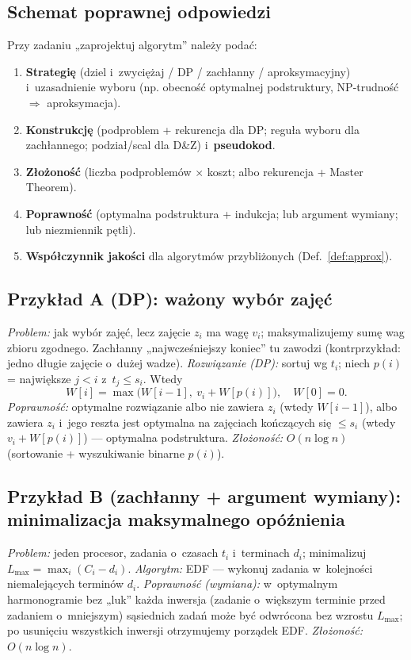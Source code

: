 \documentclass[11pt,a4paper]{article}
\theoremstyle{plain}
\theoremstyle{definition}
\begin{document}
\subsection{Schemat poprawnej odpowiedzi}
Przy zadaniu „zaprojektuj algorytm'' należy podać:
\begin{enumerate}[label=\arabic*.,leftmargin=1.8em]
\item \textbf{Strategię} (dziel i~zwyciężaj / DP / zachłanny / aproksymacyjny) i~uzasadnienie wyboru
(np. obecność optymalnej podstruktury, NP\hbox{-}trudność $\Rightarrow$ aproksymacja).
\item \textbf{Konstrukcję} (podproblem + rekurencja dla DP; reguła wyboru dla zachłannego; podział/scal dla
D\&Z) i~\textbf{pseudokod}.
\item \textbf{Złożoność} (liczba podproblemów $\times$ koszt; albo rekurencja + Master Theorem).
\item \textbf{Poprawność} (optymalna podstruktura + indukcja; lub argument wymiany; lub niezmiennik pętli).
\item \textbf{Współczynnik jakości} dla algorytmów przybliżonych (Def.~\ref{def:approx}).
\end{enumerate}

\subsection{Przykład A (DP): ważony wybór zajęć}
\emph{Problem:} jak wybór zajęć, lecz zajęcie $z_i$ ma wagę $v_i$; maksymalizujemy sumę wag zbioru zgodnego.
Zachłanny „najwcześniejszy koniec'' tu zawodzi (kontrprzykład: jedno długie zajęcie o~dużej wadze).
\emph{Rozwiązanie (DP):} sortuj wg $t_i$; niech $p(i)$ = największe $j<i$ z~$t_j\le s_i$. Wtedy
\[
W[i]=\max\big(W[i-1],\ v_i+W[p(i)]\big),\quad W[0]=0.
\]
\emph{Poprawność:} optymalne rozwiązanie albo nie zawiera $z_i$ (wtedy $W[i-1]$), albo zawiera $z_i$ i~jego
reszta jest optymalna na zajęciach kończących się $\le s_i$ (wtedy $v_i+W[p(i)]$) --- optymalna podstruktura.
\emph{Złożoność:} $O(n\log n)$ (sortowanie + wyszukiwanie binarne $p(i)$).

\subsection{Przykład B (zachłanny + argument wymiany): minimalizacja maksymalnego opóźnienia}
\emph{Problem:} jeden procesor, zadania o~czasach $t_i$ i~terminach $d_i$; minimalizuj
$L_{\max}=\max_i(C_i-d_i)$. \emph{Algorytm:} EDF --- wykonuj zadania w~kolejności niemalejących terminów
$d_i$. \emph{Poprawność (wymiana):} w~optymalnym harmonogramie bez „luk'' każda inwersja (zadanie o~większym
terminie przed zadaniem o~mniejszym) sąsiednich zadań może być odwrócona bez wzrostu $L_{\max}$; po usunięciu
wszystkich inwersji otrzymujemy porządek EDF. \emph{Złożoność:} $O(n\log n)$.
\end{document}
